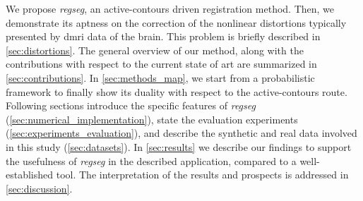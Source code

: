 We propose \emph{regseg}, an active-contours driven registration method.
Then, we demonstrate its aptness on the correction of the nonlinear distortions typically
  presented by \gls*{dmri} data of the brain.
This problem is briefly described in \autoref{sec:distortions}.
The general overview of our method, along with the contributions with respect 
  to the current state of art are summarized in \autoref{sec:contributions}.
In \autoref{sec:methods_map}, we start from a probabilistic framework to finally show its duality
  with respect to the active-contours route.
Following sections
  introduce the specific features of \emph{regseg} (\autoref{sec:numerical_implementation}),
  state the evaluation experiments (\autoref{sec:experiments_evaluation}),
  and describe the synthetic and real data involved in this study (\autoref{sec:datasets}).
In \autoref{sec:results} we describe our findings to support the usefulness of \emph{regseg}
  in the described application, compared to a well-established tool.
The interpretation of the results and prospects is addressed in \autoref{sec:discussion}.


